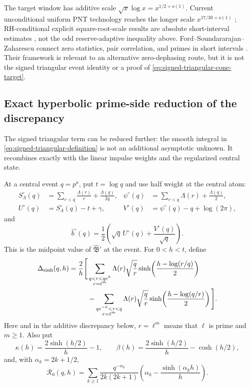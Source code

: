 \documentclass[11pt,a4paper]{article}
\numberwithin{equation}{section}
\theoremstyle{definition}
\newcommand{\Bhat}{\widehat{\mathfrak B}}
\begin{document}
The target window has additive scale \(\sqrt x\log x=x^{1/2+o(1)}\).
Current unconditional uniform PNT technology reaches the longer scale
\(x^{17/30+o(1)}\) \cite{GuthMaynard2026}; RH-conditional explicit
square-root-scale results are absolute short-interval estimates
\cite{CullyHugillDudek2022}, not the odd reserve-adaptive inequality above.
Ford--Soundararajan--Zaharescu connect zero statistics, pair correlation, and
primes in short intervals \cite{FordSoundZah2009}.  Their framework is
relevant to an alternative zero-dephasing route, but it is not the signed
triangular event identity or a proof of \eqref{eq:signed-triangular-cone-target}.

\subsection{Exact hyperbolic prime-side reduction of the discrepancy}

The signed triangular term can be reduced further: the smooth integral in
\eqref{eq:signed-triangular-definition} is not an additional asymptotic
unknown.  It recombines exactly with the linear impulse weights and the
regularized central state.

At a central event \(q=p^a\), put \(t=\log q\) and use half weight at the
central atom:
\begin{align*}
 S_\Lambda^\circ(q)
 &=\sum_{r<q}\frac{\Lambda(r)}r+\frac{\Lambda(q)}{2q},
 &
 \psi^\circ(q)
 &=\sum_{r<q}\Lambda(r)+\frac{\Lambda(q)}2,\\
 U^\circ(q)&=S_\Lambda^\circ(q)-t+\gamma,
 &
 V^\circ(q)&=\psi^\circ(q)-q+\log(2\pi),
\end{align*}
and
\begin{equation}\label{eq:Bhat-midpoint-state}
 \widehat b^\circ(q)
 =\frac12\left(\sqrt q\,U^\circ(q)
 +\frac{V^\circ(q)}{\sqrt q}\right).
\end{equation}
This is the midpoint value of \(\Bhat'\) at the event.  For \(0<h<t\),
define
\begin{align}
 \Delta_{\sinh}(q,h)=\frac2h\Bigg[&
 \sum_{\substack{q<r<qe^h\\ r=\ell^m}}
 \Lambda(r)\sqrt{\frac qr}
 \sinh\!\left(\frac{h-\log(r/q)}2\right)
 \notag\\
 &-\sum_{\substack{qe^{-h}<r<q\\ r=\ell^m}}
 \Lambda(r)\sqrt{\frac qr}
 \sinh\!\left(\frac{h-\log(q/r)}2\right)
 \Bigg].
 \label{eq:hyperbolic-prime-discrepancy}
\end{align}
Here and in the additive discrepancy below, \(r=\ell^m\) means that
\(\ell\) is prime and \(m\ge1\).
Also put
\begin{equation}\label{eq:kappa-beta-def}
 \kappa(h)=\frac{2\sinh(h/2)}h-1,
 \qquad
 \beta(h)=\frac{2\sinh(h/2)}h-\cosh(h/2),
\end{equation}
and, with \(\alpha_k=2k+1/2\),
\begin{equation}\label{eq:Rzero-midpoint-remainder}
 \mathcal R_0(q,h)
 =\sum_{k\ge1}\frac{q^{-\alpha_k}}{2k(2k+1)}
 \left(\alpha_k-\frac{\sinh(\alpha_kh)}h\right).
\end{equation}
\end{document}
